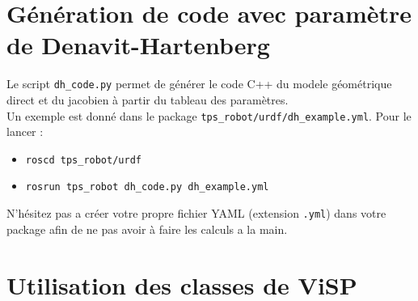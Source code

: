 \documentclass[12pt,a4paper]{article}
\begin{document}
\section{Génération de code avec paramètre de Denavit-Hartenberg}
\label{sec:DH}

Le script \texttt{dh\_code.py} permet de générer le code C++ du modele géométrique direct et du jacobien à partir du tableau des paramètres.\\
Un exemple est donné dans le package \texttt{tps\_robot/urdf/dh\_example.yml}. Pour le lancer :
\begin{itemize}
 \item \texttt{roscd tps\_robot/urdf}
 \item \texttt{rosrun tps\_robot dh\_code.py dh\_example.yml}
\end{itemize}
N'hésitez pas a créer votre propre fichier YAML (extension \texttt{.yml}) dans votre package afin de ne pas avoir à faire les calculs a la main. 


\section{Utilisation des classes de ViSP}
\label{sec:visp}
\end{document}
